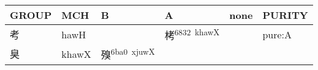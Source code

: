 \documentclass[14pt,a4paper]{scrartcl}
\begin{document}
\begin{longtable}[c]{@{}llllll@{}}
\toprule
\begin{minipage}[b]{0.14\columnwidth}\raggedright\strut
GROUP
\strut\end{minipage} &
\begin{minipage}[b]{0.14\columnwidth}\raggedright\strut
MCH
\strut\end{minipage} &
\begin{minipage}[b]{0.14\columnwidth}\raggedright\strut
B
\strut\end{minipage} &
\begin{minipage}[b]{0.14\columnwidth}\raggedright\strut
A
\strut\end{minipage} &
\begin{minipage}[b]{0.14\columnwidth}\raggedright\strut
none
\strut\end{minipage} &
\begin{minipage}[b]{0.14\columnwidth}\raggedright\strut
PURITY
\strut\end{minipage}\tabularnewline
\midrule
\endhead
\begin{minipage}[t]{0.14\columnwidth}\raggedright\strut
考
\strut\end{minipage} &
\begin{minipage}[t]{0.14\columnwidth}\raggedright\strut
hawH
\strut\end{minipage} &
\begin{minipage}[t]{0.14\columnwidth}\raggedright\strut
\strut\end{minipage} &
\begin{minipage}[t]{0.14\columnwidth}\raggedright\strut
栲\textsuperscript{6832~khawX}
\strut\end{minipage} &
\begin{minipage}[t]{0.14\columnwidth}\raggedright\strut
\strut\end{minipage} &
\begin{minipage}[t]{0.14\columnwidth}\raggedright\strut
pure:A
\strut\end{minipage}\tabularnewline
\begin{minipage}[t]{0.14\columnwidth}\raggedright\strut
臭
\strut\end{minipage} &
\begin{minipage}[t]{0.14\columnwidth}\raggedright\strut
khawX
\strut\end{minipage} &
\begin{minipage}[t]{0.14\columnwidth}\raggedright\strut
殠\textsuperscript{6ba0~xjuwX}
\strut\end{minipage} &

\end{longtable}
\end{document}
